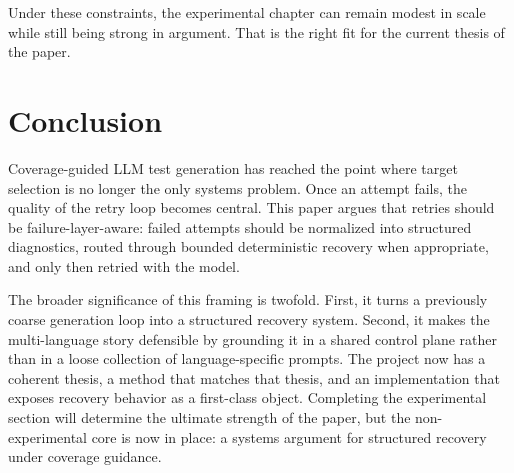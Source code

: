 \documentclass[10pt]{article}
\begin{document}
Under these constraints, the experimental chapter can remain modest in scale while still being strong in argument. That is the right fit for the current thesis of the paper.

\section{Conclusion}

Coverage-guided LLM test generation has reached the point where target selection is no longer the only systems problem. Once an attempt fails, the quality of the retry loop becomes central. This paper argues that retries should be failure-layer-aware: failed attempts should be normalized into structured diagnostics, routed through bounded deterministic recovery when appropriate, and only then retried with the model.

The broader significance of this framing is twofold. First, it turns a previously coarse generation loop into a structured recovery system. Second, it makes the multi-language story defensible by grounding it in a shared control plane rather than in a loose collection of language-specific prompts. The project now has a coherent thesis, a method that matches that thesis, and an implementation that exposes recovery behavior as a first-class object. Completing the experimental section will determine the ultimate strength of the paper, but the non-experimental core is now in place: a systems argument for structured recovery under coverage guidance.



\end{document}
